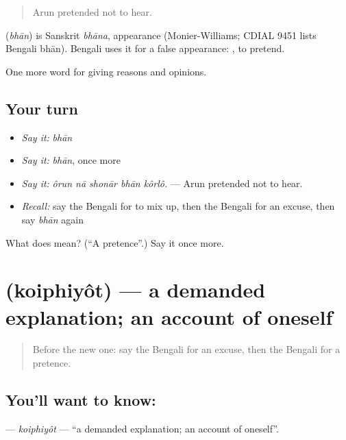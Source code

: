 \begin{quote}
Arun pretended not to hear.
\end{quote}

\begin{cousinweb}
\textbf{} (\emph{bhān}) is Sanskrit \emph{bhāna}, appearance (Monier-Williams; CDIAL 9451 lists Bengali bhān). Bengali uses it for a false appearance:  , to pretend.
\end{cousinweb}

\begin{grammarlens}[title={What you've built}]
One more word for giving reasons and opinions.
\end{grammarlens}

\subsection*{Your turn}
\begin{itemize}
\raggedright
  \item \emph{Say it:} \emph{bhān}
  \item \emph{Say it:} \emph{bhān}, once more
  \item \emph{Say it:} \emph{ôrun nā shonār bhān kôrlô.} — Arun pretended not to hear.
  \item \emph{Recall:} say the Bengali for to mix up, then the Bengali for an excuse, then say \emph{bhān} again
\end{itemize}

\begin{tcolorbox}[breakable,colback=teal!4,colframe=teal!35!black,title={Before you move on}]
What does  mean? (\textquotedblleft{}A pretence\textquotedblright{}.) Say it once more.
\end{tcolorbox}
\section[\texorpdfstring{\bn{কৈফিয়ত} (koiphiyôt)}{কৈফিয়ত (koiphiyôt)}]{ (koiphiyôt) — a demanded explanation; an account of oneself}

\label{lesson:BN-C359-koiphiyot}



\begin{quote}
Before the new one: say the Bengali for an excuse, then the Bengali for a pretence.
\end{quote}

\subsection*{You'll want to know: }
\textbf{} — \emph{koiphiyôt} — \textquotedblleft{}a demanded explanation; an account of oneself\textquotedblright{}.

